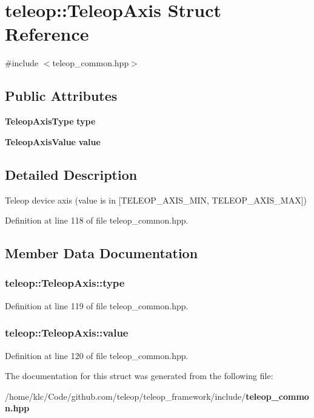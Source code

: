 \section{teleop::TeleopAxis Struct Reference}
\label{structteleop_1_1TeleopAxis}


{\ttfamily \#include $<$teleop\_\-common.hpp$>$}

\subsection*{Public Attributes}
\begin{DoxyCompactItemize}
\item 
{\bf TeleopAxisType} {\bf type}
\item 
{\bf TeleopAxisValue} {\bf value}
\end{DoxyCompactItemize}


\subsection{Detailed Description}
Teleop device axis (value is in [TELEOP\_\-AXIS\_\-MIN, TELEOP\_\-AXIS\_\-MAX]) 

Definition at line 118 of file teleop\_\-common.hpp.



\subsection{Member Data Documentation}
\subsubsection[{type}]{ {\bf teleop::TeleopAxis::type}}\label{structteleop_1_1TeleopAxis_a58fbf33e3c6d2adad996c1241f501d62}


Definition at line 119 of file teleop\_\-common.hpp.

\subsubsection[{value}]{ {\bf teleop::TeleopAxis::value}}\label{structteleop_1_1TeleopAxis_a91054bd85c1385032673ab0c235a4c59}


Definition at line 120 of file teleop\_\-common.hpp.



The documentation for this struct was generated from the following file:\begin{DoxyCompactItemize}
\item 
/home/klc/Code/github.com/teleop/teleop\_\-framework/include/{\bf teleop\_\-common.hpp}\end{DoxyCompactItemize}
